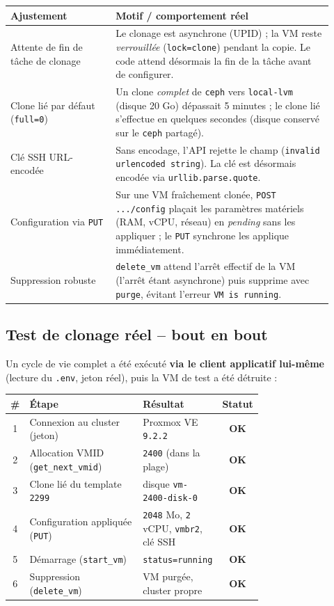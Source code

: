 \documentclass[11pt,a4paper]{article}
\newcommand{\code}[1]{\texttt{\small #1}}
\newcommand{\ok}{\textcolor{ok}{\textbf{OK}}}
\begin{document}
\begin{longtable}{@{}p{0.30\linewidth} p{0.62\linewidth}@{}}
\toprule
\textbf{Ajustement} & \textbf{Motif / comportement réel} \\
\midrule
\endhead
Attente de fin de tâche de clonage & Le clonage est asynchrone (UPID) ; la VM reste
\emph{verrouillée} (\code{lock=clone}) pendant la copie. Le code attend désormais la fin
de la tâche avant de configurer. \\
Clone lié par défaut (\code{full=0}) & Un clone \emph{complet} de \code{ceph} vers
\code{local-lvm} (disque 20 Go) dépassait 5 minutes ; le clone lié s'effectue en quelques
secondes (disque conservé sur le \code{ceph} partagé). \\
Clé SSH URL-encodée & Sans encodage, l'API rejette le champ (\code{invalid urlencoded
string}). La clé est désormais encodée via \code{urllib.parse.quote}. \\
Configuration via \code{PUT} & Sur une VM fraîchement clonée, \code{POST .../config}
plaçait les paramètres matériels (RAM, vCPU, réseau) en \emph{pending} sans les appliquer ;
le \code{PUT} synchrone les applique immédiatement. \\
Suppression robuste & \code{delete\_vm} attend l'arrêt effectif de la VM (l'arrêt étant
asynchrone) puis supprime avec \code{purge}, évitant l'erreur \code{VM is running}. \\
\bottomrule
\end{longtable}

\subsection{Test de clonage réel -- bout en bout}

Un cycle de vie complet a été exécuté \textbf{via le client applicatif lui-même} (lecture
du \code{.env}, jeton réel), puis la VM de test a été détruite :

\begin{longtable}{@{}c >{\raggedright\arraybackslash}p{0.52\linewidth} >{\raggedright\arraybackslash}p{0.20\linewidth} c@{}}
\toprule
\textbf{\#} & \textbf{Étape} & \textbf{Résultat} & \textbf{Statut} \\
\midrule
\endhead
1 & Connexion au cluster (jeton) & Proxmox VE \code{9.2.2} & \ok \\
2 & Allocation VMID (\code{get\_next\_vmid}) & \code{2400} (dans la plage) & \ok \\
3 & Clone lié du template \code{2299} & disque \code{vm-2400-disk-0} & \ok \\
4 & Configuration appliquée (\code{PUT}) & \code{2048} Mo, \code{2} vCPU, \code{vmbr2},
clé SSH & \ok \\
5 & Démarrage (\code{start\_vm}) & \code{status=running} & \ok \\
6 & Suppression (\code{delete\_vm}) & VM purgée, cluster propre & \ok \\
\bottomrule
\end{longtable}
\end{document}
